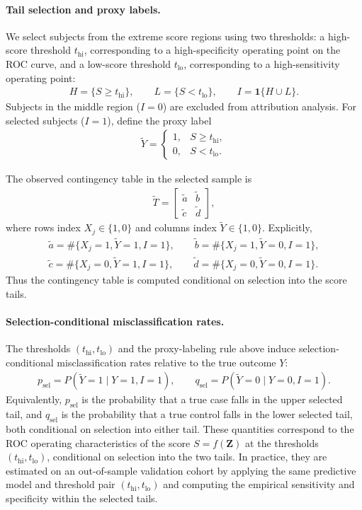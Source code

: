 \documentclass[pdflatex,sn-mathphys-num]{sn-jnl}%
\def\EQSP{3pt}
\newcommand{\cgather}[2][\EQSP]{\begingroup\setlength\abovedisplayskip{#1}\setlength\belowdisplayskip{#1}\begin{gather} #2 \end{gather}\endgroup\noindent}
\theoremstyle{thmstyleone}%
\theoremstyle{thmstyletwo}%
\theoremstyle{thmstylethree}%
\begin{document}
\paragraph{Tail selection and proxy labels.}
We select subjects from the extreme score regions using two thresholds: a high-score threshold $t_{\mathrm{hi}}$, corresponding to a high-specificity operating point on the ROC curve, and a low-score threshold $t_{\mathrm{lo}}$, corresponding to a high-sensitivity operating point:
\cgather{
H=\{S\ge t_{\mathrm{hi}}\},\qquad
L=\{S<t_{\mathrm{lo}}\},\qquad
I=\mathbf{1}\{H\cup L\}.
}
Subjects in the middle region ($I=0$) are excluded from attribution analysis. For selected subjects ($I=1$), define the proxy label
\cgather{
\tilde Y=
\begin{cases}
1,& S\ge t_{\mathrm{hi}},\\
0,& S<t_{\mathrm{lo}}.
\end{cases}
}

The observed contingency table in the selected sample is
\cgather{
\tilde{T}=
\begin{bmatrix}
\tilde{a} & \tilde{b}\\
\tilde{c} & \tilde{d}
\end{bmatrix},
}
where rows index $X_j\in\{1,0\}$ and columns index $\tilde Y\in\{1,0\}$. Explicitly,
\cgather{
\tilde a=\#\{X_j=1,\tilde Y=1,I=1\},\qquad
\tilde b=\#\{X_j=1,\tilde Y=0,I=1\},\\
\tilde c=\#\{X_j=0,\tilde Y=1,I=1\},\qquad
\tilde d=\#\{X_j=0,\tilde Y=0,I=1\}.
}
Thus the contingency table is computed conditional on selection into the score tails.


\paragraph{Selection-conditional misclassification rates.}
The thresholds $(t_{\mathrm{hi}},t_{\mathrm{lo}})$ and the proxy-labeling rule above induce selection-conditional misclassification rates relative to the true outcome $Y$:
\cgather{
p_{\mathrm{sel}}=P(\tilde Y=1\mid Y=1,I=1),\qquad
q_{\mathrm{sel}}=P(\tilde Y=0\mid Y=0,I=1).
}
Equivalently, $p_{\mathrm{sel}}$ is the probability that a true case falls in the upper selected tail, and $q_{\mathrm{sel}}$ is the probability that a true control falls in the lower selected tail, both conditional on selection into either tail. %
These quantities correspond to the ROC operating characteristics of the score $S=f(\mathbf Z)$ at the thresholds $(t_{\mathrm{hi}},t_{\mathrm{lo}})$, conditional on selection into the two tails. In practice, they are estimated on an out-of-sample validation cohort by applying the same predictive model and threshold pair $(t_{\mathrm{hi}},t_{\mathrm{lo}})$ and computing the empirical sensitivity and specificity within the selected tails.
\end{document}
